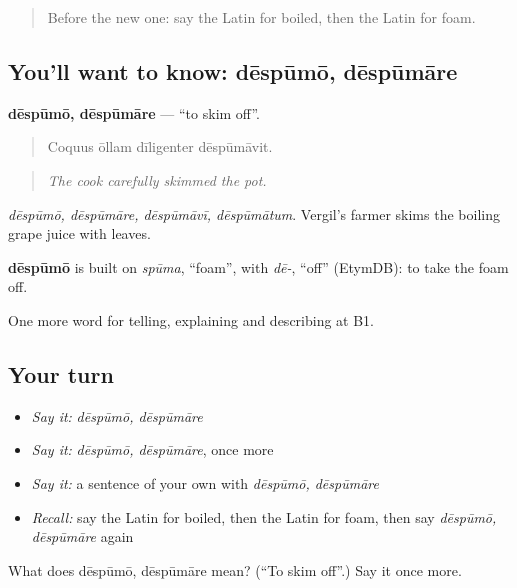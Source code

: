 \label{lesson:LA-C353-despumo}



\begin{quote}
Before the new one: say the Latin for boiled, then the Latin for foam.
\end{quote}

\subsection*{You'll want to know: dēspūmō, dēspūmāre}
\textbf{dēspūmō, dēspūmāre} — \textquotedblleft{}to skim off\textquotedblright{}.

\begin{quote}
Coquus ōllam dīligenter dēspūmāvit.
\end{quote}

\begin{quote}
\emph{The cook carefully skimmed the pot.}
\end{quote}

\emph{dēspūmō, dēspūmāre, dēspūmāvī, dēspūmātum}. Vergil's farmer skims the boiling grape juice with leaves.

\begin{cousinweb}
\textbf{dēspūmō} is built on \emph{spūma}, \textquotedblleft{}foam\textquotedblright{}, with \emph{dē-}, \textquotedblleft{}off\textquotedblright{} (EtymDB): to take the foam off.
\end{cousinweb}

\begin{grammarlens}[title={What you've built}]
One more word for telling, explaining and describing at B1.
\end{grammarlens}

\subsection*{Your turn}
\begin{itemize}
\raggedright
  \item \emph{Say it:} \emph{dēspūmō, dēspūmāre}
  \item \emph{Say it:} \emph{dēspūmō, dēspūmāre}, once more
  \item \emph{Say it:} a sentence of your own with \emph{dēspūmō, dēspūmāre}
  \item \emph{Recall:} say the Latin for boiled, then the Latin for foam, then say \emph{dēspūmō, dēspūmāre} again
\end{itemize}

\begin{tcolorbox}[breakable,colback=teal!4,colframe=teal!35!black,title={Before you move on}]
What does dēspūmō, dēspūmāre mean? (\textquotedblleft{}To skim off\textquotedblright{}.) Say it once more.
\end{tcolorbox}
